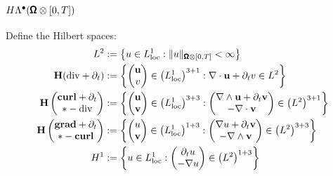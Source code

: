         \subsection*{$H\Lambda^{\bullet}(\pmb{\mathsf{\Omega}}\otimes[0, T])$}
            Define the Hilbert spaces:
            \begin{align}
                L^{2}  &:=  \left\{u \in L^{1}_{\rm loc} : \|u\|_{\pmb{\mathsf{\Omega}}\otimes[0, T]} < \infty\right\}  \\
                \mathbf{H}(\mathrm{div} + \partial_{t})  &:=  \left\{\begin{pmatrix} \mathbf{u} \\ v \end{pmatrix} \in \left(L^{1}_{\rm loc}\right)^{3 + 1} : \nabla\cdot\mathbf{u} + \partial_{t}v \in L^{2}\right\}  \\
                \mathbf{H}\left(\begin{matrix} \mathbf{curl} + \partial_{t} \\ * - \mathrm{div} \end{matrix}\right)  &:=  \left\{\begin{pmatrix} \mathbf{u} \\ \mathbf{v} \end{pmatrix} \in \left(L^{1}_{\rm loc}\right)^{3 + 3} : \begin{pmatrix} \nabla\wedge\mathbf{u} + \partial_{t}\mathbf{v} \\ - \nabla\cdot\mathbf{v} \end{pmatrix} \in \left(L^{2}\right)^{3 + 1}\right\}  \\
                \mathbf{H}\left(\begin{matrix} \mathbf{grad} + \partial_{t} \\ * - \mathbf{curl} \end{matrix}\right)  &:=  \left\{\begin{pmatrix} u \\ \mathbf{v} \end{pmatrix} \in \left(L^{1}_{\rm loc}\right)^{1 + 3} : \begin{pmatrix} \nabla u + \partial_{t}\mathbf{v} \\ - \nabla\wedge\mathbf{v} \end{pmatrix} \in \left(L^{2}\right)^{3 + 3}\right\}  \\
                H^{1}  &:=  \left\{u \in L^{1}_{\rm loc} : \begin{pmatrix} \partial_{t}u \\ - \nabla u \end{pmatrix} \in \left(L^{2}\right)^{1 + 3}\right\}
            \end{align}
